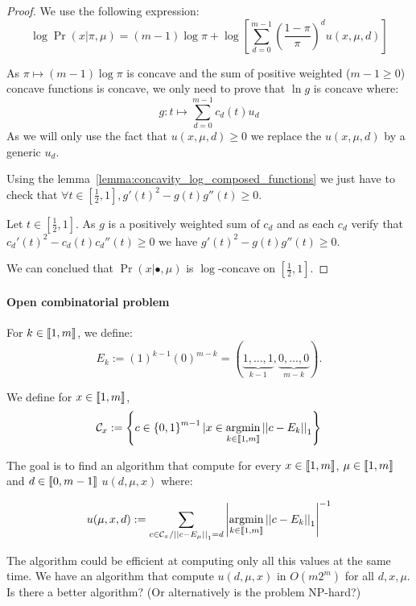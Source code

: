 \begin{proof}
    We use the following expression:
    \[\log\Pr(x | \pi, \mu) = (m-1)\log \pi + \log\left[ \sum_{d = 0}^{m-1} \left(\frac{1 - \pi}{\pi}\right)^d u(x, \mu, d) \right] \] 

    As $\pi \mapsto (m-1) \log\pi$ is concave and the sum of positive weighted ($m - 1 \geq 0$) concave functions is concave, we only need to prove that $\ln g$ is concave where:
    \[g: t\mapsto \sum_{d=0}^{m-1} c_d(t) u_d \]
    As we will only use the fact that $u(x, \mu, d) \geq 0$ we replace the $u(x, \mu, d)$ by a generic $u_d$. 

    Using the lemma~\ref{lemma:concavity_log_composed_functions} we just have to check that $\forall t \in \left[\frac{1}{2}, 1\right], g'(t)^2 - g(t) g''(t) \geq 0$.

    Let $t \in  \left[\frac{1}{2}, 1\right]$. As $g$ is a positively weighted sum of $c_d$ and as each $c_d$ verify that $c_d'(t)^2 - c_d(t) c_d''(t) \geq 0$ we have $g'(t)^2 - g(t) g''(t) \geq 0$.
    
    We can conclued that $\Pr(x | \bullet, \mu)$ is $\log$-concave on $\left[\frac{1}{2}, 1\right]$.
\end{proof}


\newpage
\paragraph{Open combinatorial problem}


\begin{definition}
    For $k \in \left\llbracket1, m\right\rrbracket$, we define:
    \[E_k := (1)^{k - 1} (0)^{m - k} = (\underset{k - 1}{\underbrace{1, \dots, 1}}, \underset{m - k}{\underbrace{0, \dots, 0}} ). \]
\end{definition}

We define for $x \in \left\llbracket1, m\right\rrbracket$, 
\[ \mathcal{C}_x := \left\{ c \in \left\{ 0, 1 \right\}^{m - 1} | x \in \operatorname*{argmin}_{k \in \left\llbracket1, m\right\rrbracket} \left|\left|c - E_k\right|\right|_1  \right\} \]

The goal is to find an algorithm that compute for every $x \in \left\llbracket1, m\right\rrbracket$, $\mu \in \left\llbracket1, m\right\rrbracket$ and $d \in \left\llbracket0, m - 1\right\rrbracket$ $u(d, \mu, x)$ where:

\[ u(\mu, x, d) := \sum_{c \in \mathcal{C}_x / \left|\left|c-E_{\mu}\right|\right|_1 = d} \left|\operatorname*{argmin}_{k \in \left\llbracket1, m\right\rrbracket} \left|\left|c - E_k\right|\right|_1\right|^{-1} \]

The algorithm could be efficient at computing only all this values at the same time.
We have an algorithm that compute $u(d, \mu, x)$ in $O(m 2^m)$ for all $d,x,\mu$. Is there a better algorithm? (Or alternatively is the problem NP-hard?)

